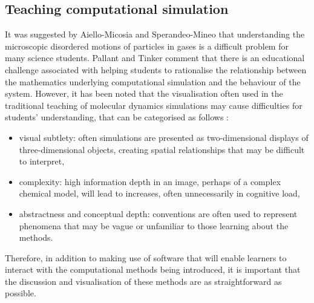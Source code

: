 \subsection{Teaching computational simulation}
It was suggested by Aiello-Micosia and Sperandeo-Mineo \cite{aiello-nicosia_computer_1985} that understanding the microscopic disordered motions of particles in gases is a difficult problem for many science students.
Pallant and Tinker \cite{pallant_reasoning_2004} comment that there is an educational challenge associated with helping students to rationalise the relationship between the mathematics underlying computational simulation and the behaviour of the system.
However, it has been noted that the visualisation often used in the traditional teaching of molecular dynamics simulations may cause difficulties for students' understanding, that can be categorised as follows \cite{jones_molecular_2005}:
\begin{itemize}
\item visual subtlety: often simulations are presented as two-dimensional displays of three-dimensional objects, creating spatial relationships that may be difficult to interpret,
\item complexity: high information depth in an image, perhaps of a complex chemical model, will lead to increases, often unnecessarily in cognitive load,
\item abstractness and conceptual depth: conventions are often used to represent phenomena that may be vague or unfamiliar to those learning about the methods.
\end{itemize}
Therefore, in addition to making use of software that will enable learners to interact with the computational methods being introduced, it is important that the discussion and visualisation of these methods are as straightforward as possible.

